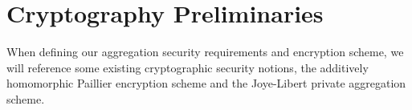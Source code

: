 \documentclass[10pt,journal,compsoc]{IEEEtran}
\theoremstyle{definition}
\theoremstyle{definition}
\theoremstyle{remark}
\begin{document}
% 
%                                                                                                        
%                                                                                                        
%                                                                                                        
% 

\section{Cryptography Preliminaries} \label{sec:crypto_prelim}
When defining our aggregation security requirements and encryption scheme, we will reference some existing cryptographic security notions, the additively homomorphic Paillier encryption scheme and the Joye-Libert private aggregation scheme.

% 
% 
\end{document}
